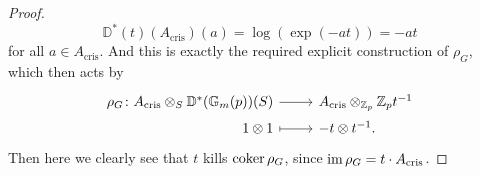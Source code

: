 \begin{proof}
	\begin{equation*}
		\mathbb{D}^*(t)(A_{\mathrm{cris}})(a) = \log \left( \exp (-at) \right) = -at
	\end{equation*}
	for all $a \in A_{\mathrm{cris}}$.
	And this is exactly the required explicit construction of $\rho_G$, which
	then acts by
	\begin{equation*}
	\begin{tikzcd}[row sep = 0ex
		,/tikz/column 1/.append style={anchor=base east}
		,/tikz/column 2/.append style={anchor=base west}]
		\rho_G\colon 
		A_{\mathrm{cris}} \otimes_S \mathbb{D}^*(\mathbb{G}_m(p))(S)
		\arrow[r, "", rightarrow] &
		A_{\mathrm{cris}} \otimes_{\mathbb{Z}_{p}} \mathbb{Z}_{p} t^{-1} \\
		1 \otimes 1 \arrow[r, "", mapsto] & -t \otimes t^{-1}
	.\end{tikzcd}
	\end{equation*} 
	Then here we clearly see that $t$ kills $\operatorname{coker} \rho_G$, since
	$\operatorname{im} \rho_G = t \cdot A_{\mathrm{cris}}$.


\end{proof}
